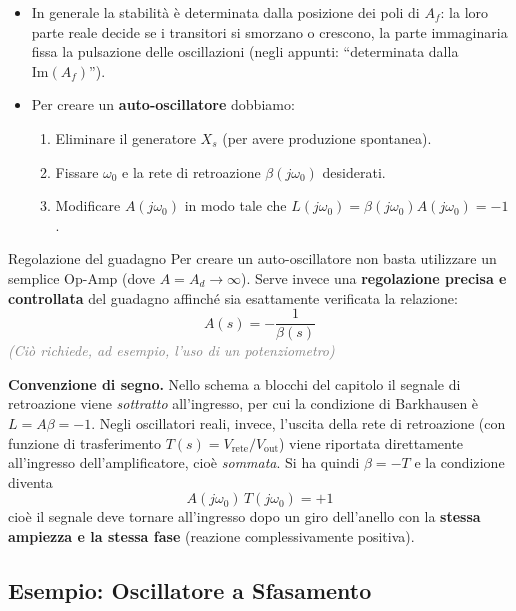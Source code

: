 \begin{itemize}
    \item In generale la stabilità è determinata dalla posizione dei poli di $A_f$: la loro parte reale decide se i transitori si smorzano o crescono, la parte immaginaria fissa la pulsazione delle oscillazioni (negli appunti: ``determinata dalla $\text{Im}(A_f)$'').
    
    \item Per creare un \textbf{auto-oscillatore} dobbiamo:
    \begin{enumerate}
        \item Eliminare il generatore $X_s$ (per avere produzione spontanea).
        \item Fissare $\omega_0$ e la rete di retroazione $\beta(j\omega_0)$ desiderati.
        \item Modificare $A(j\omega_0)$ in modo tale che $L(j\omega_0) = \beta(j\omega_0)A(j\omega_0) = -1$.
    \end{enumerate}
\end{itemize}

\begin{osservazione}{Regolazione del guadagno}
Per creare un auto-oscillatore non basta utilizzare un semplice Op-Amp (dove $A = A_d \to \infty$). Serve invece una \textbf{regolazione precisa e controllata} del guadagno affinché sia esattamente verificata la relazione:
\[
A(s) = -\frac{1}{\beta(s)}
\]
\textcolor{gray}{\small \textit{(Ciò richiede, ad esempio, l'uso di un potenziometro)}}
\end{osservazione}


\begin{important}
\textbf{Convenzione di segno.} Nello schema a blocchi del capitolo il segnale di retroazione viene \emph{sottratto} all'ingresso, per cui la condizione di Barkhausen è $L = A\beta = -1$. Negli oscillatori reali, invece, l'uscita della rete di retroazione (con funzione di trasferimento $T(s) = V_{\text{rete}}/V_{\text{out}}$) viene riportata direttamente all'ingresso dell'amplificatore, cioè \emph{sommata}. Si ha quindi $\beta = -T$ e la condizione diventa
\[
A(j\omega_0)\,T(j\omega_0) = +1
\]
cioè il segnale deve tornare all'ingresso dopo un giro dell'anello con la \textbf{stessa ampiezza e la stessa fase} (reazione complessivamente positiva).
\end{important}

\subsection{Esempio: Oscillatore a Sfasamento}

